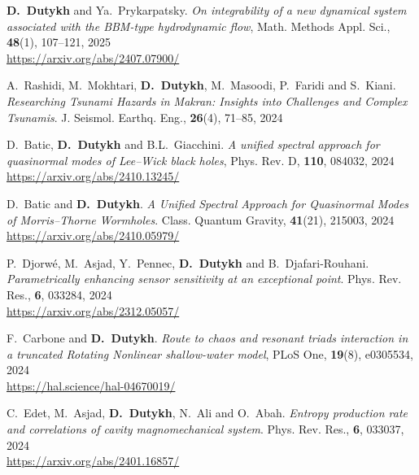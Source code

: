 \documentclass[final, a4paper, oneside, 12pt]{article}
\numberwithin{equation}{section}
\begin{document}
\begin{etaremune}
  \item \textbf{D.~Dutykh} and Ya.~Prykarpatsky. \textit{On integrability of a new dynamical system associated with the BBM-type hydrodynamic flow}, Math. Methods Appl. Sci., \textbf{48}(1), 107--121, 2025 \\ %
  \url{https://arxiv.org/abs/2407.07900/}



  \item A.~Rashidi, M.~Mokhtari, \textbf{D.~Dutykh}, M.~Masoodi, P.~Faridi and S.~Kiani. \textit{Researching Tsunami Hazards in Makran: Insights into Challenges and Complex Tsunamis}. J. Seismol. Earthq. Eng., \textbf{26}(4), 71--85, 2024 %

  \item D.~Batic, \textbf{D.~Dutykh} and B.L.~Giacchini. \textit{A unified spectral approach for quasinormal modes of Lee--Wick black holes}, Phys. Rev. D, \textbf{110}, 084032, 2024 \\ %
  \url{https://arxiv.org/abs/2410.13245/}

  \item D.~Batic and \textbf{D.~Dutykh}. \textit{A Unified Spectral Approach for Quasinormal Modes of Morris--Thorne Wormholes}. Class. Quantum Gravity, \textbf{41}(21), 215003, 2024 \\ %
  \url{https://arxiv.org/abs/2410.05979/}

  \item P.~Djorw\'e, M.~Asjad, Y.~Pennec, \textbf{D.~Dutykh} and B.~Djafari-Rouhani. \textit{Parametrically enhancing sensor sensitivity at an exceptional point}. Phys. Rev. Res., \textbf{6}, 033284, 2024 \\ %
  \url{https://arxiv.org/abs/2312.05057/}
  
  \item F.~Carbone and \textbf{D.~Dutykh}. \textit{Route to chaos and resonant triads interaction in a truncated Rotating Nonlinear shallow-water model}, PLoS One, \textbf{19}(8), e0305534, 2024 \\ %
  \url{https://hal.science/hal-04670019/}

  \item C.~Edet, M.~Asjad, \textbf{D.~Dutykh}, N.~Ali and O.~Abah. \textit{Entropy production rate and correlations of cavity magnomechanical system}. Phys. Rev. Res., \textbf{6}, 033037, 2024 \\ %
  \url{https://arxiv.org/abs/2401.16857/}


\end{etaremune}
\end{document}
